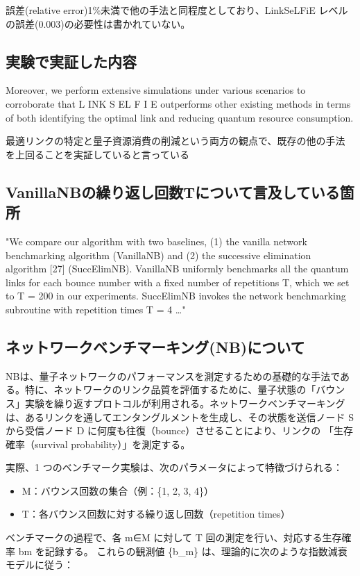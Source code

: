\documentclass[conference]{IEEEtran}
\begin{document}
誤差(relative error)1\%未満で他の手法と同程度としており、LinkSeLFiE
レベルの誤差(0.003)の必要性は書かれていない。


\subsection{実験で実証した内容}
\label{sec:org5f3c102}
Moreover, we perform extensive simulations under
various scenarios to corroborate that L INK S EL F I E outperforms
other existing methods in terms of both identifying the optimal
link and reducing quantum resource consumption.

最適リンクの特定と量子資源消費の削減という両方の観点で、既存の他の手法
を上回ることを実証していると言っている

\subsection{VanillaNBの繰り返し回数Tについて言及している箇所}
\label{sec:orgc85485f}
"We compare our algorithm with two baselines, (1) the vanilla network
benchmarking algorithm (VanillaNB) and (2) the successive elimination
algorithm [27] (SuccElimNB).  VanillaNB uniformly benchmarks all the
quantum links for each bounce number with a fixed number of
repetitions T, which we set to T = 200 in our experiments.  SuccElimNB
invokes the network benchmarking subroutine with repetition times T =
4 …"




\subsection{ネットワークベンチマーキング(NB)について}
\label{sec:org8cde9f6}
NBは、量子ネットワークのパフォーマンスを測定するための基礎的な手法であ
る。特に、ネットワークのリンク品質を評価するために、量子状態の「バウン
ス」実験を繰り返すプロトコルが利用される。ネットワークベンチマーキング
は、あるリンクを通してエンタングルメントを生成し、その状態を送信ノード
S から受信ノード D に何度も往復（bounce）させることにより、リンクの
「生存確率（survival probability）」を測定する。

実際、1 つのベンチマーク実験は、次のパラメータによって特徴づけられる：
\begin{itemize}
\item M：バウンス回数の集合（例：\{1, 2, 3, 4\}）
\item T：各バウンス回数に対する繰り返し回数（repetition times）
\end{itemize}
ベンチマークの過程で、各 m∈M に対して T 回の測定を行い、対応する生存確
率 bm を記録する。
これらの観測値 \{b\_m\} は、理論的に次のような指数減衰モデルに従う：
\end{document}
